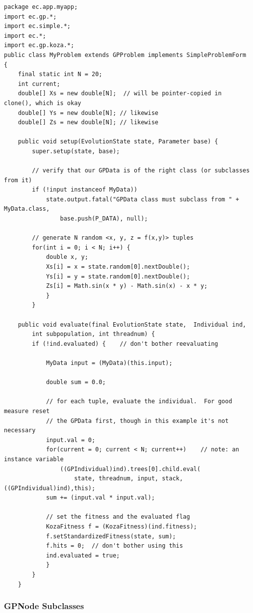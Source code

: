 \documentclass[twoside,10pt]{book}
\begin{document}
{\small
\begin{verbatim}
package ec.app.myapp;
import ec.gp.*;
import ec.simple.*;
import ec.*;
import ec.gp.koza.*;
public class MyProblem extends GPProblem implements SimpleProblemForm {
    final static int N = 20;
    int current;
    double[] Xs = new double[N];  // will be pointer-copied in clone(), which is okay
    double[] Ys = new double[N]; // likewise
    double[] Zs = new double[N]; // likewise
	
    public void setup(EvolutionState state, Parameter base) {
        super.setup(state, base);
        
        // verify that our GPData is of the right class (or subclasses from it)
        if (!input instanceof MyData))
            state.output.fatal("GPData class must subclass from " + MyData.class,
                base.push(P_DATA), null);

        // generate N random <x, y, z = f(x,y)> tuples
        for(int i = 0; i < N; i++) {
            double x, y;
            Xs[i] = x = state.random[0].nextDouble();
            Ys[i] = y = state.random[0].nextDouble();
            Zs[i] = Math.sin(x * y) - Math.sin(x) - x * y;
            }
        }
	
    public void evaluate(final EvolutionState state,  Individual ind, 
        int subpopulation, int threadnum) {
        if (!ind.evaluated) {    // don't bother reevaluating
            
            MyData input = (MyData)(this.input);

            double sum = 0.0;
            
            // for each tuple, evaluate the individual.  For good measure reset
            // the GPData first, though in this example it's not necessary
            input.val = 0;
            for(current = 0; current < N; current++)    // note: an instance variable
                ((GPIndividual)ind).trees[0].child.eval(
                    state, threadnum, input, stack, ((GPIndividual)ind),this);
            sum += (input.val * input.val);
            
            // set the fitness and the evaluated flag
            KozaFitness f = (KozaFitness)(ind.fitness);
            f.setStandardizedFitness(state, sum);
            f.hits = 0;  // don't bother using this
            ind.evaluated = true;
            }
        }
    }
\end{verbatim}
}

\subsubsection{GPNode Subclasses}
\end{document}
